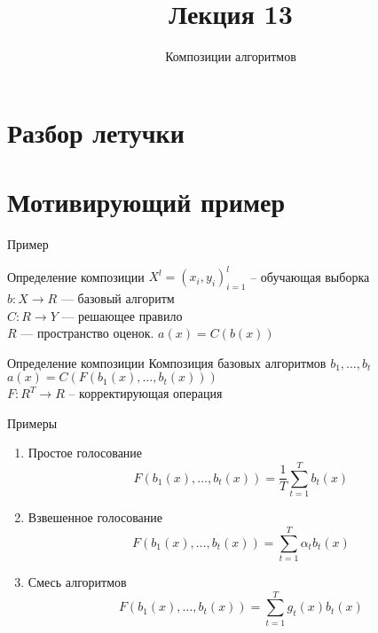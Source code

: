 \documentclass[10pt]{beamer}
\title{Лекция 13}
\subtitle{Композиции алгоритмов}
\begin{document}
\maketitle

\section{Разбор летучки}

\section{Мотивирующий пример}

\begin{frame}{Пример}
\end{frame}


\begin{frame}{Определение композиции}
  ${X^l = (x_i, y_i)_{i = 1}^l}$ -- обучающая выборка\\
  $b:X \rightarrow R$ --- базовый алгоритм\\
  $C:R \rightarrow Y$ --- решающее правило\\
  $R$ --- пространство оценок.
  \bigbreak
  $a(x) = C(b(x))$\\
\end{frame}

\begin{frame}{Определение композиции}
  Композиция базовых алгоритмов $b_1, \dots, b_t$\\
  \bigbreak
  $a(x) = C(F(b_1(x), \dots, b_t(x)))$\\
  $F: R^T \rightarrow R$ -- корректирующая операция
\end{frame}

\begin{frame}{Примеры}
  \begin{enumerate}
    \item Простое голосование\\
      $$F(b_1(x), \dots, b_t(x)) = \frac{1}{T} \sum\limits_{t=1}^{T} b_t(x)$$
    \item Взвешенное голосование\\
      $$F(b_1(x), \dots, b_t(x)) = \sum\limits_{t=1}^{T} \alpha_t b_t(x)$$
    \item Смесь алгоритмов\\
      $$F(b_1(x), \dots, b_t(x)) = \sum\limits_{t=1}^{T} g_t(x) b_t(x)$$      
  \end{enumerate}
\end{frame}
\end{document}
